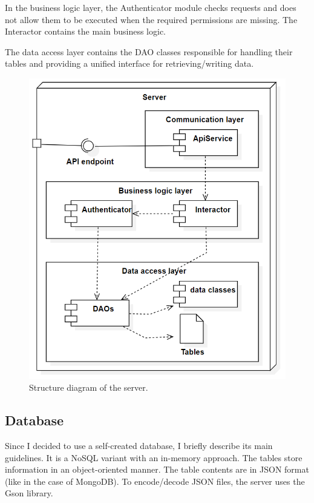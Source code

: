 In the business logic layer, the Authenticator module checks requests and does not allow them to be executed when the required permissions are missing. The Interactor contains the main business logic.

The data access layer contains the DAO classes responsible for handling their tables and providing a unified interface for retrieving/writing data.

\begin{figure}[htb]
 \centerline{\includegraphics[width=1.0\columnwidth]{.//Figure/System/ServerStructure.PNG}}
 \caption{Structure diagram of the server.}
 \label{fig:simple}
\end{figure}

\subsection{Database}

Since I decided to use a self-created database, I briefly describe its main guidelines. It is a NoSQL variant with an in-memory approach. The tables store information in an object-oriented manner. The table contents are in JSON format (like in the case of MongoDB). To encode/decode JSON files, the server uses the Gson library.

